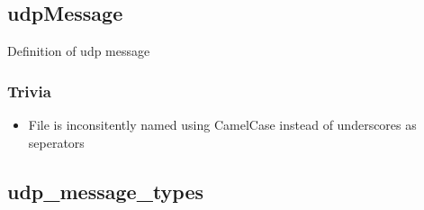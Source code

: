 \subsection{udpMessage}
Definition of udp message


\subsubsection{Trivia}

\begin{itemize}
	\item File is inconsitently named using CamelCase instead of underscores as seperators
\end{itemize}

\subsection{udp\_message\_types}
